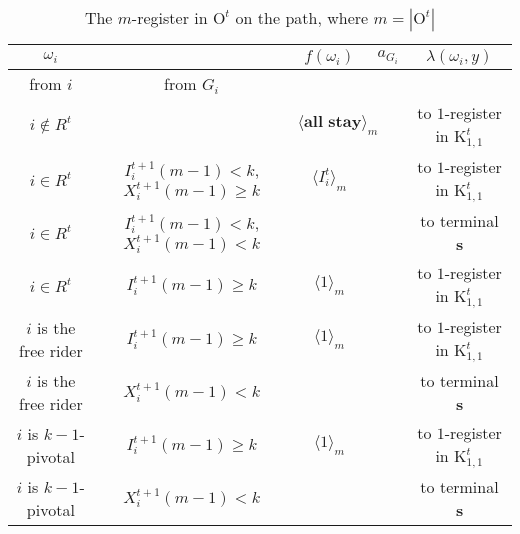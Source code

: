 \documentclass[12pt,letter]{article}
\newcommand{\Kappa}{\mathrm{K}}
\newcommand{\Omicron}{\mathrm{O}}
\theoremstyle{definition}
\theoremstyle{remark}
\theoremstyle{claim}
\begin{document}
\begin{table}[!htbp]
\caption{The $m$-register in $\Omicron^t$ on the path, where $m=|\Omicron^t|$}
\begin{center}
\begin{tabular}{c c | c | c | c}
$\omega_i$ 	 & 	   &	$f(\omega_i)$  &	$a_{G_i}$ & $\lambda(\omega_i,y)$ \\
\hline
\hline
from $i$ 	 & from $G_i$	  & 	&	 & \\
\hline
$i\notin R^t$  	& 								& $\langle \textbf{all stay} \rangle_m$		&  			& to $1$-register in $\Kappa^t_{1,1}$ \\
$i\in R^t$  	& $I^{t+1}_i(m-1)<k$, $X^{t+1}_i(m-1)\geq k$		    & $\langle I^t_i \rangle_m$ 		&    			& to $1$-register in $\Kappa^t_{1,1}$ \\
$i\in R^t$	 	&  $I^{t+1}_i(m-1)< k$, $X^{t+1}_i(m-1)<k$			&  	& 									  & to terminal \textbf{s} \\
$i\in R^t$	 	&  $I^{t+1}_i(m-1)\geq k$			& $\langle 1 \rangle_m$ 	& 									  & to $1$-register in $\Kappa^t_{1,1}$ \\
$i$ is the free rider  	&  		$I^{t+1}_i(m-1)\geq k$				& $\langle 1 \rangle_m$ 		& 				  & to $1$-register in $\Kappa^t_{1,1}$ \\
$i$ is the free rider  	&  		$X^{t+1}_i(m-1)<k$					&  		& 										  & to terminal \textbf{s} \\
$i$ is $k-1$-pivotal  	&  		$I^{t+1}_i(m-1)\geq k$			& $\langle 1 \rangle_m$ 	& 											 & to $1$-register in $\Kappa^t_{1,1}$ \\
$i$ is $k-1$-pivotal  	&  	$X^{t+1}_i(m-1)<k$		&  	& 											 & to terminal \textbf{s} \\
\hline
\end{tabular}
\end{center}
\end{table}
\end{document}
